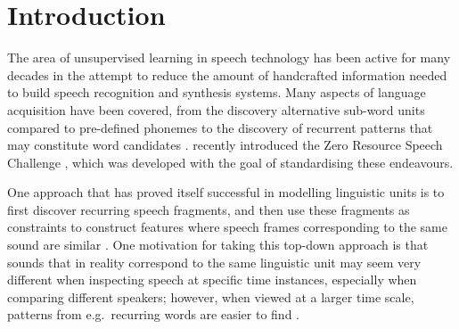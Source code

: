 \section{Introduction}
\label{sec:introduction}

The area of unsupervised learning in speech technology has been active for many decades in the attempt to reduce the amount of handcrafted information needed to build speech recognition and synthesis systems. Many aspects of language acquisition have been covered, from the discovery alternative sub-word units compared to pre-defined phonemes \parencite{LeeEtAl1988,SvendsenEtAl1989,BacchianiEtAl1996,Huijbregts, OGrady:2008up} to the discovery of recurrent patterns that may constitute word candidates \cite{Rasanen2011149, ParkAndGlass2008, Aimetti2010, StoutenEtAl2008phonepatterns, DriesenEtAl2009adaptivenon-negative}.
\citeauthor{versteegh2015zero} recently introduced the Zero Resource Speech Challenge \parencite{versteegh2015zero}, which was developed with the goal of standardising these endeavours. %

One approach that has proved itself successful in modelling linguistic units is to first discover recurring speech fragments, and then use these fragments as constraints to construct features where speech frames corresponding to the same sound are similar \parencite{synnaeve2014phonetics,thiolliere2015hybrid}.
One motivation for taking this top-down approach is that sounds that in reality correspond to the same linguistic unit may seem very different when inspecting speech at specific time instances, especially when comparing different speakers; however, when viewed at a larger time scale, patterns from e.g.\ recurring words are easier to find \parencite{jansen2013weak}.


